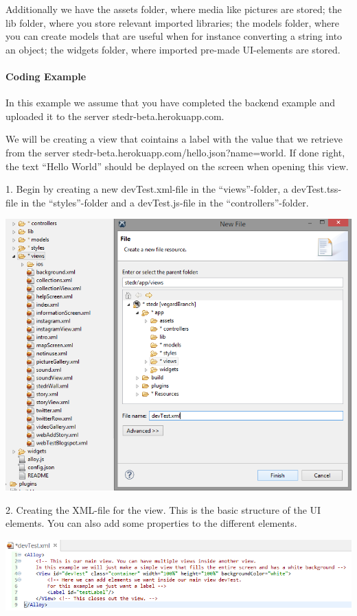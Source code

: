 Additionally we have the assets folder, where media like pictures are stored; the lib folder, where you store relevant imported libraries; the models folder, where you can create models that are useful when for instance converting a string into an object; the widgets folder, where imported pre-made UI-elements are stored.


\paragraph{Coding Example}
In this example we assume that you have completed the backend example and uploaded it to the server stedr-beta.herokuapp.com.

We will be creating a view that cointains a label with the value that we retrieve from the server stedr-beta.herokuapp.com/hello.json?name=world. If done right, the text “Hello World” should be deplayed on the screen when opening this view. 

1. Begin by creating a new devTest.xml-file in the “views”-folder, a devTest.tss-file in the “styles”-folder and a devTest.js-file in the “controllers”-folder.

\begin{center}
\includegraphics[scale=0.45]{guide/f6.png} 
\end{center}

2. Creating the XML-file for the view. This is the basic structure of the UI elements. You can also add some properties to the different elements.

\begin{center}
\includegraphics[scale=0.45]{guide/f7.png} 
\end{center}

